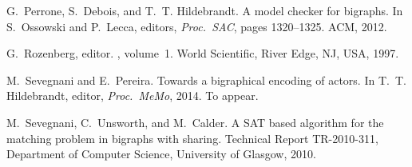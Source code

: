 \documentclass[a4paper,english,10pt]{article}
\theoremstyle{plain}\newtheorem{theorem}{Theorem}
\theoremstyle{plain}\newtheorem{corollary}[theorem]{Corollary}
\theoremstyle{plain}\newtheorem{proposition}[theorem]{Proposition}
\theoremstyle{plain}\newtheorem{lemma}[theorem]{Lemma}
\theoremstyle{plain}\newtheorem{definition}{Definition}
\theoremstyle{plain}\newtheorem{remark}{Remark}
\theoremstyle{plain}\newtheorem{example}[remark]{Example}
\newcommand{\?}[1]{}
\begin{document}
{\begin{thebibliography}{10}
G.~Perrone, S.~Debois, and T.~T. Hildebrandt.
\newblock A model checker for bigraphs.
\newblock In S.~Ossowski and P.~Lecca, editors, {\em Proc.~SAC}, pages
  1320--1325. ACM, 2012.

G.~Rozenberg, editor.
, volume~1.
\newblock World Scientific, River Edge, NJ, USA, 1997.

M.~Sevegnani and E.~Pereira.
\newblock Towards a bigraphical encoding of actors.
\newblock In T.~T. Hildebrandt, editor, {\em Proc.~MeMo}, 2014.
\newblock To appear.

M.~Sevegnani, C.~Unsworth, and M.~Calder.
\newblock A {SAT} based algorithm for the matching problem in bigraphs with
  sharing.
\newblock Technical Report TR-2010-311, Department of Computer Science,
  University of Glasgow, 2010.

\end{thebibliography}
}
\end{document}
